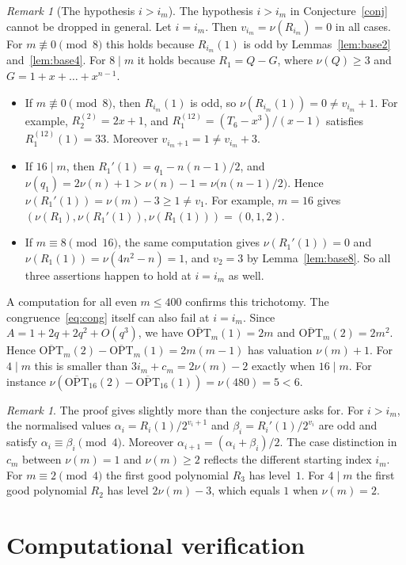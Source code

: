 \documentclass[11pt]{amsart}
\theoremstyle{definition}
\theoremstyle{remark}
\newtheorem{remark}[theorem]{Remark}
\newcommand{\OPT}{\overline{\mathrm{OPT}}}
\begin{document}
\begin{remark}[The hypothesis $i>i_m$]\label{rem:im}
The hypothesis $i>i_m$ in Conjecture~\ref{conj} cannot be dropped in general. Let $i=i_m$. Then $v_{i_m}=\nu(R_{i_m})=0$ in all cases. For $m\not\equiv0\pmod8$ this holds because $R_{i_m}(1)$ is odd by Lemmas~\ref{lem:base2} and~\ref{lem:base4}. For $8\mid m$ it holds because $R_1=Q-G$, where $\nu(Q)\ge3$ and $G=1+x+\dots+x^{n-1}$.
\begin{itemize}
\item If $m\not\equiv0\pmod 8$, then $R_{i_m}(1)$ is odd, so $\nu(R_{i_m}(1))=0\neq v_{i_m}+1$. For example, $R^{(2)}_2=2x+1$, and $R^{(12)}_1=(T_6-x^3)/(x-1)$ satisfies $R^{(12)}_1(1)=33$. Moreover $v_{i_m+1}=1\ne v_{i_m}+3$.
\item If $16\mid m$, then $R_1'(1)=q_1-n(n-1)/2$, and $\nu(q_1)=2\nu(n)+1>\nu(n)-1=\nu\big(n(n-1)/2\big)$. Hence $\nu(R_1'(1))=\nu(m)-3\ge1\ne v_1$. For example, $m=16$ gives $(\nu(R_1),\nu(R_1'(1)),\nu(R_1(1)))=(0,1,2)$.
\item If $m\equiv8\pmod{16}$, the same computation gives $\nu(R_1'(1))=0$ and $\nu(R_1(1))=\nu(4n^2-n)=1$, and $v_2=3$ by Lemma~\ref{lem:base8}. So all three assertions happen to hold at $i=i_m$ as well.
\end{itemize}
A computation for all even $m\le400$ confirms this trichotomy. The congruence~\eqref{eq:cong} itself can also fail at $i=i_m$. Since $A=1+2q+2q^2+O(q^3)$, we have $\OPT_m(1)=2m$ and $\OPT_m(2)=2m^2$. Hence $\OPT_m(2)-\OPT_m(1)=2m(m-1)$ has valuation $\nu(m)+1$. For $4\mid m$ this is smaller than $3i_m+c_m=2\nu(m)-2$ exactly when $16\mid m$. For instance $\nu(\OPT_{16}(2)-\OPT_{16}(1))=\nu(480)=5<6$.
\end{remark}

\begin{remark}
The proof gives slightly more than the conjecture asks for. For $i>i_m$, the normalised values $\alpha_i=R_i(1)/2^{v_i+1}$ and $\beta_i=R_i'(1)/2^{v_i}$ are odd and satisfy $\alpha_i\equiv\beta_i\pmod 4$. Moreover $\alpha_{i+1}=(\alpha_i+\beta_i)/2$. The case distinction in $c_m$ between $\nu(m)=1$ and $\nu(m)\ge2$ reflects the different starting index $i_m$. For $m\equiv2\pmod 4$ the first good polynomial $R_3$ has level~$1$. For $4\mid m$ the first good polynomial $R_2$ has level $2\nu(m)-3$, which equals $1$ when $\nu(m)=2$.
\end{remark}

\section{Computational verification}\label{sec:verif}
\end{document}
